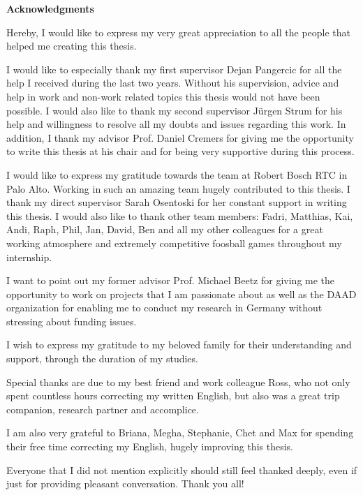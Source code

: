 \clearemptydoublepage
{}
{}	

\vspace*{1cm}
\begin{center}
{\Large \bf Acknowledgments}
\end{center}
\vspace{1cm}

Hereby, I would like to express my very great appreciation to all the people that helped me creating this thesis.

I would like to especially thank my first supervisor Dejan Pangercic for all the help I received during the last two years. Without his supervision, advice and help in work and non-work related topics this thesis would not have been possible. I would also like to thank my second supervisor J{\"u}rgen Strum for his help and willingness to resolve all my doubts and issues regarding this work. In addition, I thank my advisor Prof. Daniel Cremers for giving me the opportunity to write this thesis at his chair and for being very supportive during this process.

I would like to express my gratitude towards the team at Robert Bosch RTC in Palo Alto. Working in such an amazing team hugely contributed to this thesis. I thank my direct supervisor Sarah Osentoski for her constant support in writing this thesis. I would also like to thank other team members: Fadri, Matthias, Kai, Andi, Raph, Phil, Jan, David, Ben and all my other colleagues for a great working atmosphere and extremely competitive foosball games throughout my internship.

I want to point out my former advisor Prof. Michael Beetz for giving me the opportunity to work on projects that I am passionate about as well as the DAAD organization for enabling me to conduct my research in Germany without stressing about funding issues.

I wish to express my gratitude to my beloved family for their understanding and support, through the duration of my studies.

Special thanks are due to my best friend and work colleague Ross, who not only spent countless hours correcting my written English, but also was a great trip companion, research partner and accomplice.

I am also very grateful to Briana, Megha, Stephanie, Chet and Max for spending their free time correcting my English, hugely improving this thesis. 


Everyone that I did not mention explicitly should still feel thanked deeply, even if
just for providing pleasant conversation.
Thank you all!


